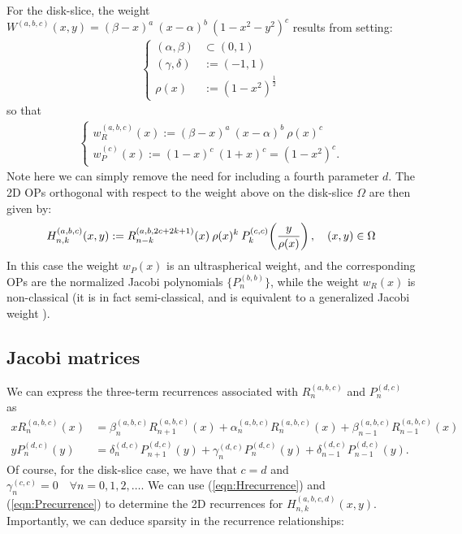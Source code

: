 \documentclass[11pt, oneside]{article}   	%
\newcommand{\bstodo}{\todo[color=pink]}
\newcommand{\half}{\frac{1}{2}}
\newcommand{\R}{\mathbb{R}}
\newcommand{\hdop}{H}
\newcommand{\Wab}{{W^{(a,b)}}}
\newcommand{\jac}{{P}}
\newcommand{\genjac}{R}
\newcommand{\genjacnmk}{\genjac_{n-k}}
\newcommand{\genjacw}{w_\genjac}
\newcommand{\jacw}{w_P}
\newcommand{\hdopnkabc}{\hdop_{n,k}^{(a,b,c)}}
\newcommand{\Wabc}{{W^{(a,b,c)}}}
\newcommand{\hdopnkabcd}{\hdop_{n,k}^{(a,b,c,d)}}
\begin{document}
For the disk-slice, the weight $\Wabc(x,y) = (\beta - x)^a \: (x - \alpha)^b \: (1-x^2-y^2)^c$ results from setting:
\begin{align*}
\begin{cases}
	(\alpha,\beta) &\subset (0,1) \\
	(\gamma,\delta) &:= (-1,1) \\
	\rho(x) &:= (1-x^2)^{\half}
\end{cases}
\end{align*}
so that
\begin{align*}
\begin{cases}
	\genjacw^{(a,b,c)}(x) :=  (\beta - x)^a \: (x - \alpha)^b \: \rho(x)^{c} \\
	\jacw^{(c)}(x) := (1-x)^c \: (1+x)^c = (1-x^2)^c.
\end{cases}
\end{align*}
Note here we can simply remove the need for including a fourth parameter $d$. The 2D OPs orthogonal with respect to the weight above on the disk-slice $\Omega$ are then given by:
\begin{align}\label{eq:diskpolys}
	\hdopnkabc(x,y) := \genjacnmk^{(a, b, 2c+2k+1)}(x) \: \rho(x)^k \: \jac_k^{(c,c)}\fpr(\frac{y}{\rho(x)}), \quad (x,y) \in \Omega
\end{align}
In this case the weight $\jacw(x)$ is an ultraspherical weight, and the corresponding OPs are the normalized Jacobi polynomials $\{\jac_n^{(b, b)}\}$, while the weight $w_R(x)$ is non-classical (it is in fact semi-classical, and is equivalent to a generalized Jacobi weight \cite[\S5]{magnus1995painleve}).



\subsection{Jacobi matrices}

We can express the three-term recurrences associated \bstodo{typo 3}with $\genjac_n^{(a,b,c)}$ and $\jac_n^{(d,c)}$ as 
\begin{align}
	x \genjac_n^{(a,b,c)}(x) &= \beta_n^{(a,b,c)} \genjac_{n+1}^{(a,b,c)}(x) + \alpha_n^{(a,b,c)} \genjac_n^{(a,b,c)}(x) + \beta_{n-1}^{(a,b,c)} \genjac_{n-1}^{(a,b,c)}(x) \label{eqn:Hrecurrence} \\
	y \jac_n^{(d,c)}(y) &= \delta_n^{(d,c)} \jac_{n+1}^{(d,c)}(y) + \gamma_{n}^{(d,c)} \jac_{n}^{(d,c)}(y) + \delta_{n-1}^{(d,c)} \jac_{n-1}^{(d,c)}(y). \label{eqn:Precurrence}
\end{align}
Of course, for the disk-slice case, we have that $c = d$ and $\gamma_{n}^{(c,c)} = 0 \quad \forall n=0,1,2,\dots$. We can use (\ref{eqn:Hrecurrence}) and (\ref{eqn:Precurrence}) to determine the 2D recurrences for $\hdopnkabcd(x,y)$. Importantly, we can deduce sparsity in the recurrence relationships:
\end{document}
